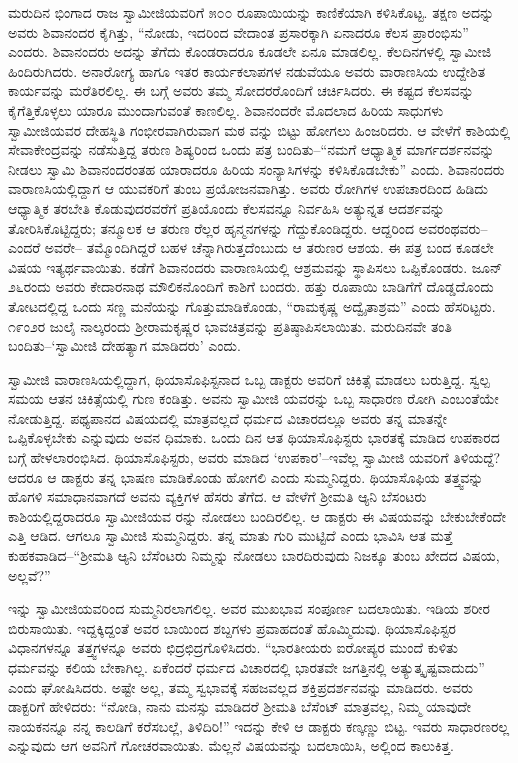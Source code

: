 ಮರುದಿನ ಭಿಂಗಾದ ರಾಜ ಸ್ವಾಮೀಜಿಯವರಿಗೆ ೫೦೦ ರೂಪಾಯಿಯನ್ನು ಕಾಣಿಕೆಯಾಗಿ ಕಳಿಸಿಕೊಟ್ಟ. ತಕ್ಷಣ ಅದನ್ನು ಅವರು ಶಿವಾನಂದರ ಕೈಗಿತ್ತು, “ನೋಡು, ಇದರಿಂದ ವೇದಾಂತ ಪ್ರಸಾರಕ್ಕಾಗಿ ಏನಾದರೂ ಕೆಲಸ ಪ್ರಾರಂಭಿಸು” ಎಂದರು. ಶಿವಾನಂದರು ಅದನ್ನು ತೆಗೆದು ಕೊಂಡರಾದರೂ ಕೂಡಲೇ ಏನೂ ಮಾಡಲಿಲ್ಲ. ಕೆಲದಿನಗಳಲ್ಲಿ ಸ್ವಾಮೀಜಿ ಹಿಂದಿರುಗಿದರು. ಅನಾರೋಗ್ಯ ಹಾಗೂ ಇತರ ಕಾರ್ಯಕಲಾಪಗಳ ನಡುವೆಯೂ ಅವರು ವಾರಾಣಸಿಯ ಉದ್ದೇಶಿತ ಕಾರ್ಯವನ್ನು ಮರೆತಿರಲಿಲ್ಲ. ಈ ಬಗ್ಗೆ ಅವರು ತಮ್ಮ ಸೋದರರೊಂದಿಗೆ ಚರ್ಚಿಸಿದರು. ಈ ಕಷ್ಟದ ಕೆಲಸವನ್ನು ಕೈಗೆತ್ತಿಕೊಳ್ಳಲು ಯಾರೂ ಮುಂದಾಗುವಂತೆ ಕಾಣಲಿಲ್ಲ. ಶಿವಾನಂದರೇ ಮೊದಲಾದ ಹಿರಿಯ ಸಾಧುಗಳು ಸ್ವಾಮೀಜಿಯವರ ದೇಹಸ್ಥಿತಿ ಗಂಭೀರವಾಗಿರುವಾಗ ಮಠ ವನ್ನು ಬಿಟ್ಟು ಹೋಗಲು ಹಿಂಜರಿದರು. ಆ ವೇಳೆಗೆ ಕಾಶಿಯಲ್ಲಿ ಸೇವಾಕೇಂದ್ರವನ್ನು ನಡೆಸುತ್ತಿದ್ದ ತರುಣ ಶಿಷ್ಯರಿಂದ ಒಂದು ಪತ್ರ ಬಂದಿತು–“ನಮಗೆ ಆಧ್ಯಾತ್ಮಿಕ ಮಾರ್ಗದರ್ಶನವನ್ನು ನೀಡಲು ಸ್ವಾಮಿ ಶಿವಾನಂದರಂತಹ ಯಾರಾದರೂ ಹಿರಿಯ ಸಂನ್ಯಾಸಿಗಳನ್ನು ಕಳಿಸಿಕೊಡಬೇಕು” ಎಂದು. ಶಿವಾನಂದರು ವಾರಾಣಸಿಯಲ್ಲಿದ್ದಾಗ ಆ ಯುವಕರಿಗೆ ತುಂಬ ಪ್ರಯೋಜನವಾಗಿತ್ತು. ಅವರು ರೋಗಿಗಳ ಉಪಚಾರದಿಂದ ಹಿಡಿದು ಆಧ್ಯಾತ್ಮಿಕ ತರಬೇತಿ ಕೊಡುವುದರವರೆಗೆ ಪ್ರತಿಯೊಂದು ಕೆಲಸವನ್ನೂ ನಿರ್ವಹಿಸಿ ಅತ್ಯುನ್ನತ ಆದರ್ಶವನ್ನು ತೋರಿಸಿಕೊಟ್ಟಿದ್ದರು; ತನ್ಮೂಲಕ ಆ ತರುಣ ರೆಲ್ಲರ ಹೃನ್ಮನಗಳನ್ನು ಗೆದ್ದುಕೊಂಡಿದ್ದರು. ಆದ್ದರಿಂದ ಅವರಂಥವರು–ಎಂದರೆ ಅವರೇ– ತಮ್ಮೊಂದಿಗಿದ್ದರೆ ಬಹಳ ಚೆನ್ನಾಗಿರುತ್ತದೆಂಬುದು ಆ ತರುಣರ ಆಶಯ. ಈ ಪತ್ರ ಬಂದ ಕೂಡಲೇ ವಿಷಯ ಇತ್ಯರ್ಥವಾಯಿತು. ಕಡೆಗೆ ಶಿವಾನಂದರು ವಾರಾಣಸಿಯಲ್ಲಿ ಆಶ್ರಮವನ್ನು ಸ್ಥಾಪಿಸಲು ಒಪ್ಪಿಕೊಂಡರು. ಜೂನ್ ೨೬ರಂದು ಅವರು ಕೇದಾರನಾಥ ಮೌಲಿಕನೊಂದಿಗೆ ಕಾಶಿಗೆ ಬಂದರು. ಹತ್ತು ರೂಪಾಯಿ ಬಾಡಿಗೆಗೆ ದೊಡ್ಡದೊಂದು ತೋಟದಲ್ಲಿದ್ದ ಒಂದು ಸಣ್ಣ ಮನೆಯನ್ನು ಗೊತ್ತುಮಾಡಿಕೊಂಡು, “ರಾಮಕೃಷ್ಣ ಅದ್ವೈತಾಶ್ರಮ” ಎಂದು ಹೆಸರಿಟ್ಟರು. ೧೯ಂ೨ರ ಜುಲೈ ನಾಲ್ಕರಂದು ಶ್ರೀರಾಮಕೃಷ್ಣರ ಭಾವಚಿತ್ರವನ್ನು ಪ್ರತಿಷ್ಠಾಪಿಸಲಾಯಿತು. ಮರುದಿನವೇ ತಂತಿ ಬಂದಿತು–‘ಸ್ವಾಮೀಜಿ ದೇಹತ್ಯಾಗ ಮಾಡಿದರು’ ಎಂದು.

ಸ್ವಾಮೀಜಿ ವಾರಾಣಸಿಯಲ್ಲಿದ್ದಾಗ, ಥಿಯಾಸೊಫಿಸ್ಟನಾದ ಒಬ್ಬ ಡಾಕ್ಟರು ಅವರಿಗೆ ಚಿಕಿತ್ಸೆ ಮಾಡಲು ಬರುತ್ತಿದ್ದ. ಸ್ವಲ್ಪ ಸಮಯ ಆತನ ಚಿಕಿತ್ಸೆಯಲ್ಲಿ ಗುಣ ಕಂಡಿತ್ತು. ಅವನು ಸ್ವಾಮೀಜಿ ಯವರನ್ನು ಒಬ್ಬ ಸಾಧಾರಣ ರೋಗಿ ಎಂಬಂತೆಯೇ ನೋಡುತ್ತಿದ್ದ. ಪಥ್ಯಪಾನದ ವಿಷಯದಲ್ಲಿ ಮಾತ್ರವಲ್ಲದೆ ಧರ್ಮದ ವಿಚಾರದಲ್ಲೂ ಅವರು ತನ್ನ ಮಾತನ್ನೇ ಒಪ್ಪಿಕೊಳ್ಳಬೇಕು ಎನ್ನುವುದು ಅವನ ಧಿಮಾಕು. ಒಂದು ದಿನ ಆತ ಥಿಯಾಸೊಫಿಸ್ಟರು ಭಾರತಕ್ಕೆ ಮಾಡಿದ ಉಪಕಾರದ ಬಗ್ಗೆ ಹೇಳಲಾರಂಭಿಸಿದ. ಥಿಯಾಸೊಫಿಸ್ಟರು, ಅವರು ಮಾಡಿದ ‘ಉಪಕಾರ’–ಇವೆಲ್ಲ ಸ್ವಾಮೀಜಿ ಯವರಿಗೆ ತಿಳಿಯದ್ದೆ? ಆದರೂ ಆ ಡಾಕ್ಟರು ತನ್ನ ಭಾಷಣ ಮಾಡಿಕೊಂಡು ಹೋಗಲಿ ಎಂದು ಸುಮ್ಮನಿದ್ದರು. ಥಿಯಾಸೊಫಿಯ ತತ್ತ್ವವನ್ನು ಹೊಗಳಿ ಸಮಾಧಾನವಾಗದೆ ಅವನು ವ್ಯಕ್ತಿಗಳ ಹೆಸರು ತೆಗೆದ. ಆ ವೇಳೆಗೆ ಶ್ರೀಮತಿ ಆ್ಯನಿ ಬೆಸಂಟರು ಕಾಶಿಯಲ್ಲಿದ್ದರಾದರೂ ಸ್ವಾಮೀಜಿಯವ ರನ್ನು ನೋಡಲು ಬಂದಿರಲಿಲ್ಲ. ಆ ಡಾಕ್ಟರು ಈ ವಿಷಯವನ್ನು ಬೇಕುಬೇಕೆಂದೇ ಎತ್ತಿ ಆಡಿದ. ಆಗಲೂ ಸ್ವಾಮೀಜಿ ಸುಮ್ಮನಿದ್ದರು. ತನ್ನ ಮಾತು ಗುರಿ ಮುಟ್ಟಿದೆ ಎಂದು ಭಾವಿಸಿ ಆತ ಮತ್ತೆ ಕುಹಕವಾಡಿದ–“ಶ್ರೀಮತಿ ಆ್ಯನಿ ಬೆಸೆಂಟರು ನಿಮ್ಮನ್ನು ನೋಡಲು ಬಾರದಿರುವುದು ನಿಜಕ್ಕೂ ತುಂಬ ಖೇದದ ವಿಷಯ, ಅಲ್ಲವೆ?”

ಇನ್ನು ಸ್ವಾಮೀಜಿಯವರಿಂದ ಸುಮ್ಮನಿರಲಾಗಲಿಲ್ಲ. ಅವರ ಮುಖಭಾವ ಸಂಪೂರ್ಣ ಬದಲಾಯಿತು. ಇಡಿಯ ಶರೀರ ಬಿರುಸಾಯಿತು. ಇದ್ದಕ್ಕಿದ್ದಂತೆ ಅವರ ಬಾಯಿಂದ ಶಬ್ದಗಳು ಪ್ರವಾಹದಂತೆ ಹೊಮ್ಮಿದುವು. ಥಿಯಾಸೊಫಿಸ್ಟರ ವಿಧಾನಗಳನ್ನೂ ತತ್ತ್ವಗಳನ್ನೂ ಅವರು ಛಿದ್ರಛಿದ್ರಗೊಳಿಸಿದರು. “ಭಾರತೀಯರು ಐರೋಪ್ಯರ ಮುಂದೆ ಕುಳಿತು ಧರ್ಮವನ್ನು ಕಲಿಯ ಬೇಕಾಗಿಲ್ಲ. ಏಕೆಂದರೆ ಧರ್ಮದ ವಿಚಾರದಲ್ಲಿ ಭಾರತವೇ ಜಗತ್ತಿನಲ್ಲಿ ಅತ್ಯುತ್ಕೃಷ್ಟವಾದುದು” ಎಂದು ಘೋಷಿಸಿದರು. ಅಷ್ಟೇ ಅಲ್ಲ, ತಮ್ಮ ಸ್ವಭಾವಕ್ಕೆ ಸಹಜವಲ್ಲದ ಶಕ್ತಿಪ್ರದರ್ಶನವನ್ನು ಮಾಡಿದರು. ಅವರು ಡಾಕ್ಟರಿಗೆ ಹೇಳಿದರು: “ನೋಡಿ, ನಾನು ಮನಸ್ಸು ಮಾಡಿದರೆ ಶ್ರೀಮತಿ ಬೆಸೆಂಟ್ ಮಾತ್ರವಲ್ಲ, ನಿಮ್ಮ ಯಾವುದೇ ನಾಯಕನನ್ನೂ ನನ್ನ ಕಾಲಡಿಗೆ ಕರೆಸಬಲ್ಲೆ, ತಿಳಿದಿರಿ!” ಇದನ್ನು ಕೇಳಿ ಆ ಡಾಕ್ಟರು ಕಣ್ಕಣ್ಣು ಬಿಟ್ಟ. ಇವರು ಸಾಧಾರಣರಲ್ಲ ಎನ್ನುವುದು ಆಗ ಅವನಿಗೆ ಗೋಚರವಾಯಿತು. ಮೆಲ್ಲನೆ ವಿಷಯವನ್ನು ಬದಲಾಯಿಸಿ, ಅಲ್ಲಿಂದ ಕಾಲುಕಿತ್ತ.

